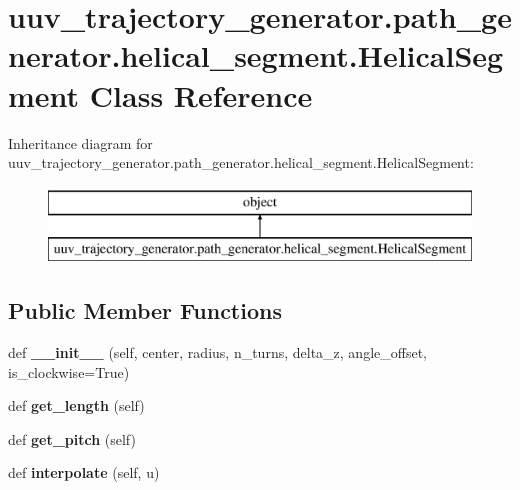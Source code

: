\hypertarget{classuuv__trajectory__generator_1_1path__generator_1_1helical__segment_1_1HelicalSegment}{}\section{uuv\+\_\+trajectory\+\_\+generator.\+path\+\_\+generator.\+helical\+\_\+segment.\+Helical\+Segment Class Reference}
\label{classuuv__trajectory__generator_1_1path__generator_1_1helical__segment_1_1HelicalSegment}
Inheritance diagram for uuv\+\_\+trajectory\+\_\+generator.\+path\+\_\+generator.\+helical\+\_\+segment.\+Helical\+Segment\+:\begin{figure}[H]
\begin{center}
\leavevmode
\includegraphics[height=2.000000cm]{classuuv__trajectory__generator_1_1path__generator_1_1helical__segment_1_1HelicalSegment}
\end{center}
\end{figure}
\subsection*{Public Member Functions}
\begin{DoxyCompactItemize}
\item 
\mbox{\label{classuuv__trajectory__generator_1_1path__generator_1_1helical__segment_1_1HelicalSegment_a24cd1792f5247ff725fed130c0c36d43}} 
def {\bfseries \+\_\+\+\_\+init\+\_\+\+\_\+} (self, center, radius, n\+\_\+turns, delta\+\_\+z, angle\+\_\+offset, is\+\_\+clockwise=True)
\item 
\mbox{\label{classuuv__trajectory__generator_1_1path__generator_1_1helical__segment_1_1HelicalSegment_a629cb0cdbe5d5d7c91c2198d0b024084}} 
def {\bfseries get\+\_\+length} (self)
\item 
\mbox{\label{classuuv__trajectory__generator_1_1path__generator_1_1helical__segment_1_1HelicalSegment_acff99fcfcb2246fe7ed422b91186b98e}} 
def {\bfseries get\+\_\+pitch} (self)
\item 
\mbox{\label{classuuv__trajectory__generator_1_1path__generator_1_1helical__segment_1_1HelicalSegment_a03b024443ace910883c336bf5c905877}} 
def {\bfseries interpolate} (self, u)
\end{DoxyCompactItemize}


